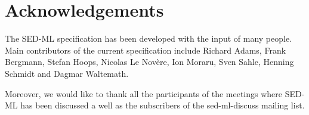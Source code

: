 \chapter{Acknowledgements}
\label{sec:acknowledgments}
The SED-ML specification has been developed with the input of many people. Main contributors of the current specification include Richard Adams, Frank Bergmann, Stefan Hoops, Nicolas Le Nov\`ere, Ion Moraru, Sven Sahle, Henning Schmidt and  Dagmar Waltemath.

Moreover, we would like to thank all the participants of the meetings where SED-ML has been discussed a well as the subscribers of the sed-ml-discuss mailing list.

